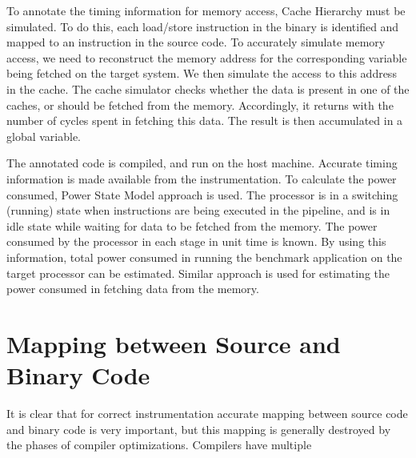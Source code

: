 To annotate the timing information for memory access, Cache Hierarchy must be simulated. To do this, each load/store instruction in the binary is identified and mapped to an instruction in the source code. To accurately simulate memory access, we need to reconstruct the memory address for the corresponding variable being fetched on the target system. We then simulate the access to this address in the cache. The cache simulator checks whether the data is present in one of the caches, or should be fetched from the memory. Accordingly, it returns with the number of cycles spent in fetching this data. The result is then accumulated in a global variable.

The annotated code is compiled, and run on the host machine. Accurate timing information is made available from the instrumentation. To calculate the power consumed, Power State Model approach is used. The processor is in a switching (running) state when instructions are being executed in the pipeline, and is in idle state while waiting for data to be fetched from the memory. The power consumed by the processor in each stage in unit time is known. By using this information, total power consumed in running the benchmark application on the target processor can be estimated. Similar approach is used for estimating the power consumed in fetching data from the memory.

\section{Mapping between Source and Binary Code}
It is clear that for correct instrumentation accurate mapping between source code and binary code is very important, but this mapping is generally destroyed by the phases of compiler optimizations. Compilers have multiple



